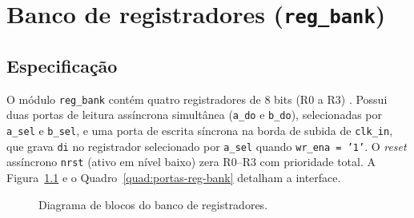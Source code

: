 \documentclass[
	12pt,				%
	oneside,			%
	a4paper,			%
	sumario = tradicional,
	english,			%
	brazilian			%
	]{abntex2}
\newcommand{\fio}{2.2} %
\newcommand{\pentrada}[3]{\draw[->,#3] ($(bloco.west)+(-\fio,#1)$) -- ($(bloco.west)+(0,#1)$);
  \node[port, anchor=east] at ($(bloco.west)+(-\fio-0.1,#1)$) {#2};}
\newcommand{\psaida}[3]{\draw[->,#3] ($(bloco.east)+(0,#1)$) -- ($(bloco.east)+(\fio,#1)$);
  \node[port, anchor=west] at ($(bloco.east)+(\fio+0.1,#1)$) {#2};}
\begin{document}
\chapter{Banco de registradores (\texttt{reg\_bank})}
\label{cap:reg_bank}

\section{Especificação}

O módulo \texttt{reg\_bank} contém quatro registradores de 8 bits (R0 a R3) \cite{tp2}. Possui duas portas de leitura assíncrona simultânea (\texttt{a\_do} e \texttt{b\_do}), selecionadas por \texttt{a\_sel} e \texttt{b\_sel}, e uma porta de escrita síncrona na borda de subida de \texttt{clk\_in}, que grava \texttt{di} no registrador selecionado por \texttt{a\_sel} quando \texttt{wr\_ena = '1'}. O \textit{reset} assíncrono \texttt{nrst} (ativo em nível baixo) zera R0--R3 com prioridade total. A Figura~\ref{fig:bloco-reg-bank} e o Quadro~\ref{quad:portas-reg-bank} detalham a interface.

\begin{figure}[!htb]
\caption{Diagrama de blocos do banco de registradores.}\label{fig:bloco-reg-bank}
\centering
{}
\end{figure}
\end{document}
